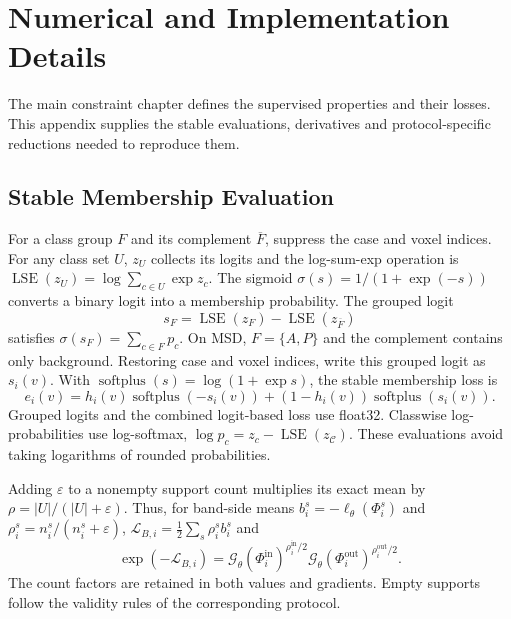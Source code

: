 \documentclass[12pt,a4paper]{article}
\begin{document}
\section{Numerical and Implementation Details}
\label{sec:technical-details}

The main constraint chapter defines the supervised properties and their
losses. This appendix supplies the stable evaluations, derivatives and
protocol-specific reductions needed to reproduce them.

\subsection{Stable Membership Evaluation}

For a class group $F$ and its complement $\overline F$, suppress the
case and voxel indices. For any class set $U$, $z_U$ collects its logits
and the log-sum-exp operation is
$\operatorname{LSE}(z_U)=\log\sum_{c\in U}\exp z_c$.
The sigmoid $\sigma(s)=1/(1+\exp(-s))$ converts a binary logit into a
membership probability. The grouped logit
\begin{equation}
s_F=\operatorname{LSE}(z_F)-\operatorname{LSE}(z_{\overline F})
\label{eq:grouped-predicate-logit}
\end{equation}
satisfies $\sigma(s_F)=\sum_{c\in F}p_c$. On MSD, $F=\{A,P\}$
and the complement contains only background. Restoring case and voxel
indices, write this grouped logit as $s_i(v)$. With
$\operatorname{softplus}(s)=\log(1+\exp s)$, the stable membership loss is
\begin{equation}
e_i(v)=h_i(v)\operatorname{softplus}(-s_i(v))
       +(1-h_i(v))\operatorname{softplus}(s_i(v)).
\label{eq:band-stable-bce}
\end{equation}
Grouped logits and the combined logit-based loss use float32.
Classwise log-probabilities use log-softmax,
$\log p_c=z_c-\operatorname{LSE}(z_{\mathcal C})$. These evaluations avoid taking logarithms of rounded
probabilities.

Adding $\varepsilon$ to a nonempty support count multiplies its exact
mean by $\rho=|U|/(|U|+\varepsilon)$. Thus, for band-side means
$b_i^s=-\ell_\theta(\Phi_i^s)$ and
$\rho_i^s=n_i^s/(n_i^s+\varepsilon)$,
$\mathcal L_{B,i}=\tfrac12\sum_s\rho_i^s b_i^s$ and
\begin{equation}
\exp(-\mathcal{L}_{B,i})
=\mathcal{G}_\theta(\Phi_i^{\mathrm{in}})^{\rho_i^{\mathrm{in}}/2}
 \mathcal{G}_\theta(\Phi_i^{\mathrm{out}})^{\rho_i^{\mathrm{out}}/2}.
\label{eq:balanced-band-satisfaction}
\end{equation}
The count factors are retained in both values and gradients. Empty
supports follow the validity rules of the corresponding protocol.
\end{document}
